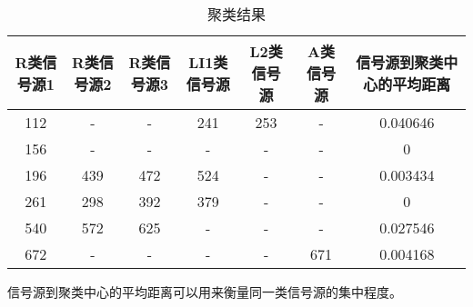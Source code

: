 \begin{table}[htbp]
	\centering
	\caption{聚类结果}\small
	\begin{tabular}{ccccccc}
		\toprule
		R类信号源1         & R类信号源2   & R类信号源3         & LI1类信号源 & L2类信号源 & A类信号源  	&	信号源到聚类中心的平均距离	\\
		\midrule
		112 & -     & -     & 241 & 253 &   -  & 0.040646 \\
		156 & -     & -     & -      & -      &   -  & 0        \\
		196 & 439 & 472 & 524 & -      &  -   & 0.003434 \\
		261 & 298 & 392 & 379 & -      &  -  & 0        \\
		540   & 572   & 625   &   -     &    -    &   -  &   0.027546       \\
		672   &  -     &   -    &    -    &   -     & 671 & 	0.004168	\\ 
		\bottomrule
	\end{tabular}
\end{table}
\par 信号源到聚类中心的平均距离可以用来衡量同一类信号源的集中程度。
